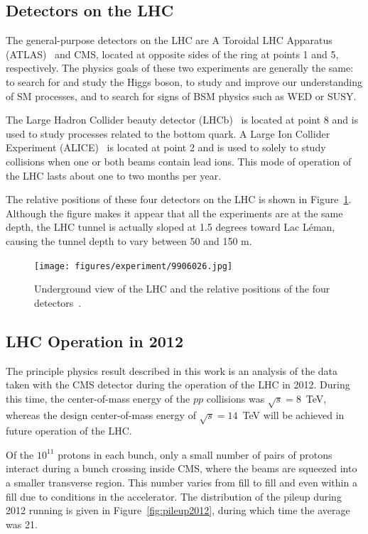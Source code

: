 \subsection{Detectors on the LHC\label{subsec:detectors}}

The general-purpose detectors on the LHC are A Toroidal LHC Apparatus (ATLAS)~\cite{cern-jinst-atlas}
and CMS, located at opposite sides of the ring at points 1 and 5, respectively. The physics
goals of these two experiments are generally the same: to search for and study the Higgs boson,
to study and improve our understanding of SM processes, and to search for signs of BSM physics such as
WED or SUSY.

The Large Hadron Collider beauty detector (LHCb)~\cite{cern-jinst-lhcb}
is located at point 8 and is used
to study processes related to the bottom quark. A Large Ion Collider Experiment
(ALICE)~\cite{cern-jinst-alice} is located
at point 2 and is used to solely to study collisions when one or both beams contain lead ions. This
mode of operation of the LHC lasts about one to two months per year.

The relative positions of these four detectors on the LHC is shown in Figure~\ref{fig:lhc_detectors}.
Although the figure makes it appear that all the experiments are at the same depth, the LHC tunnel is
actually sloped at 1.5 degrees toward Lac L\'{e}man,
causing the tunnel depth to vary between 50 and 150 m.

\begin{figure}[ht]
 \begin{center}
    \texttt{[image: figures/experiment/9906026.jpg]}
      \end{center}
\caption{Underground view of the LHC and the relative positions of the four detectors~\cite{Dailler:842399}.}
\label{fig:lhc_detectors}
\end{figure}

\subsection{LHC Operation in 2012}

The principle physics result described in this work is an analysis of the data taken with the
CMS detector during the operation of the LHC in 2012. During this time, the center-of-mass energy
of the $pp$ collisions was $\sqrt{s} = 8$~TeV, whereas the design center-of-mass energy of
$\sqrt{s} = 14$~TeV will be achieved in future operation of the LHC. 

Of the $10^{11}$ protons in each bunch, only a small number of pairs of protons interact during
a bunch crossing inside CMS, where the beams are squeezed into a smaller transverse region. This number
varies from fill to fill and even within a fill due to conditions in the accelerator. The distribution
of the pileup during 2012 running is given in Figure~\ref{fig:pileup2012}, during which time the
average was 21.

